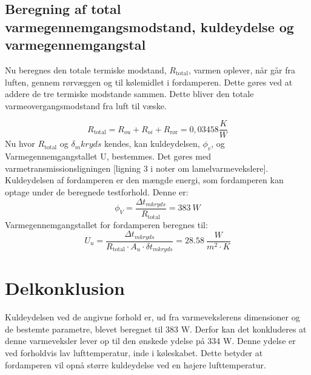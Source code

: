 \documentclass[../Hovedrapport.tex]{subfiles}
\begin{document}
\subsection{Beregning af total varmegennemgangsmodstand, kuldeydelse og varmegennemgangstal}
    \label{sec:Varmeledningsmodstand}

Nu beregnes den totale termiske modstand,  $R_\text{total}$, varmen oplever, når går fra luften, gennem rørvæggen og til kølemidlet i fordamperen. Dette gøres ved at addere de tre termiske modstande sammen. Dette bliver den totale varmeovergangsmodstand fra luft til væske. 

\begin{equation}
R_\text{total} = R_{ou} + R_{oi} + R_\text{rør} = \si{0,03458}{\frac{K}{W}} 	 
\end{equation}
Nu hvor $R_\text{total}$ og $\delta_mkryds$ kendes, kan kuldeydelsen, $\phi_v$, og Varmegennemgangstallet U, bestemmes. Det gøres med varmetransmissionsligningen [ligning 3 i noter om lamelvarmevekslere]. Kuldeydelsen af fordamperen er den mængde energi, som fordamperen kan optage under de beregnede testforhold. Denne er:
\begin{equation}
\phi_{V} = \frac {{\Delta t}_{mkryds}}{R_\text{total}} = \SI{383}{W}
\end{equation}
Varmegennemgangstallet for fordamperen beregnes til:
\begin{equation}
U_u = \frac {{\Delta t}_{mkryds}}{R_\text{total} \cdot  A_{u} \cdot  {\delta t}_{mkryds}} = \SI{28,58}{\frac{W}{m^2 \cdot K}}
\end{equation}
\section{Delkonklusion}
Kuldeydelsen ved de angivne forhold er, ud fra varmevekslerens dimensioner og de bestemte parametre, blevet beregnet til 383 W. Derfor kan det konkluderes at denne varmeveksler lever op til den ønskede ydelse på 334 W.
Denne ydelse er ved forholdvis lav lufttemperatur, inde i køleskabet. Dette betyder at fordamperen vil opnå større kuldeydelse ved en højere lufttemperatur.
\end{document}
